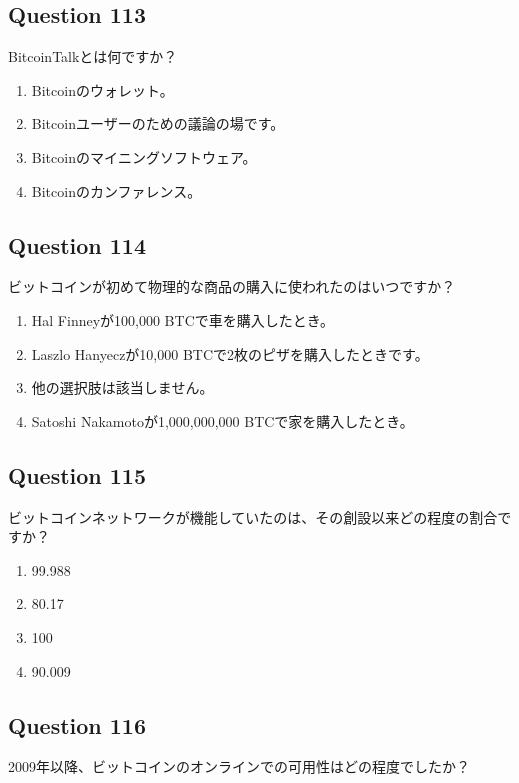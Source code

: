 \documentclass[12pt,a4paper]{article}
\begin{document}
\bigskip


\subsection*{Question 113}
BitcoinTalkとは何ですか？

\begin{enumerate}[label=\Alph*., leftmargin=*]
\item Bitcoinのウォレット。
\item Bitcoinユーザーのための議論の場です。
\item Bitcoinのマイニングソフトウェア。
\item Bitcoinのカンファレンス。
\end{enumerate}

\bigskip


\subsection*{Question 114}
ビットコインが初めて物理的な商品の購入に使われたのはいつですか？

\begin{enumerate}[label=\Alph*., leftmargin=*]
\item Hal Finneyが100,000 BTCで車を購入したとき。
\item Laszlo Hanyeczが10,000 BTCで2枚のピザを購入したときです。
\item 他の選択肢は該当しません。
\item Satoshi Nakamotoが1,000,000,000 BTCで家を購入したとき。
\end{enumerate}

\bigskip


\subsection*{Question 115}
ビットコインネットワークが機能していたのは、その創設以来どの程度の割合ですか？

\begin{enumerate}[label=\Alph*., leftmargin=*]
\item 99.988%
\item 80.17%
\item 100%
\item 90.009%
\end{enumerate}

\bigskip


\subsection*{Question 116}
2009年以降、ビットコインのオンラインでの可用性はどの程度でしたか？
\end{document}
